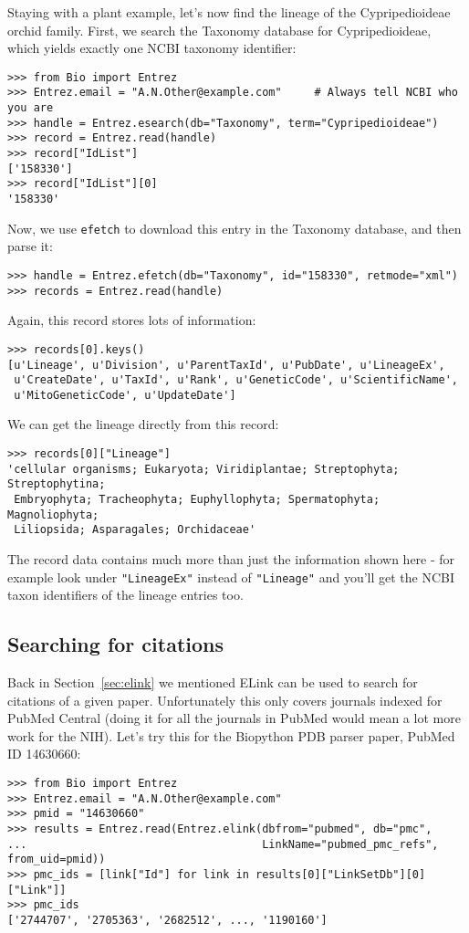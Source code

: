 \documentclass{report}
\begin{document}
Staying with a plant example, let's now find the lineage of the Cypripedioideae orchid family. First, we search the Taxonomy database for Cypripedioideae, which yields exactly one NCBI taxonomy identifier:
\begin{verbatim}
>>> from Bio import Entrez
>>> Entrez.email = "A.N.Other@example.com"     # Always tell NCBI who you are
>>> handle = Entrez.esearch(db="Taxonomy", term="Cypripedioideae")
>>> record = Entrez.read(handle)
>>> record["IdList"]
['158330']
>>> record["IdList"][0]
'158330'
\end{verbatim}
Now, we use \verb+efetch+ to download this entry in the Taxonomy database, and then parse it:
\begin{verbatim}
>>> handle = Entrez.efetch(db="Taxonomy", id="158330", retmode="xml")
>>> records = Entrez.read(handle)
\end{verbatim}
Again, this record stores lots of information:
\begin{verbatim}
>>> records[0].keys()
[u'Lineage', u'Division', u'ParentTaxId', u'PubDate', u'LineageEx',
 u'CreateDate', u'TaxId', u'Rank', u'GeneticCode', u'ScientificName',
 u'MitoGeneticCode', u'UpdateDate']
\end{verbatim}
We can get the lineage directly from this record:
\begin{verbatim}
>>> records[0]["Lineage"]
'cellular organisms; Eukaryota; Viridiplantae; Streptophyta; Streptophytina;
 Embryophyta; Tracheophyta; Euphyllophyta; Spermatophyta; Magnoliophyta;
 Liliopsida; Asparagales; Orchidaceae'
\end{verbatim}

The record data contains much more than just the information shown here - for example look under \texttt{"LineageEx"} instead of \texttt{"Lineage"} and you'll get the NCBI taxon identifiers of the lineage entries too.

\subsection{Searching for citations}
\label{sec:elink-citations}

Back in Section~\ref{sec:elink} we mentioned ELink can be used to search for citations of a given paper.
Unfortunately this only covers journals indexed for PubMed Central
(doing it for all the journals in PubMed would mean a lot more work for the NIH).
Let's try this for the Biopython PDB parser paper, PubMed ID 14630660:

\begin{verbatim}
>>> from Bio import Entrez
>>> Entrez.email = "A.N.Other@example.com"
>>> pmid = "14630660"
>>> results = Entrez.read(Entrez.elink(dbfrom="pubmed", db="pmc",
...                                    LinkName="pubmed_pmc_refs", from_uid=pmid))
>>> pmc_ids = [link["Id"] for link in results[0]["LinkSetDb"][0]["Link"]]
>>> pmc_ids
['2744707', '2705363', '2682512', ..., '1190160']
\end{verbatim}
\end{document}
